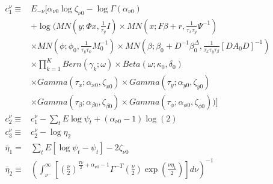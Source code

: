 \documentclass[11pt]{article}
\begin{document}
\begin{align*}
	c_{1}^{\nu}\equiv&E_{-\nu}\Bigg[\alpha_{\nu0}\log\zeta_{\nu0}-\log\Gamma\left(\alpha_{\nu0}\right)\\&+\log\Bigg(MN\left(y;\Phi x,\frac{1}{\tau_{y}}I\right)\times MN\left(x;F\beta+r,\frac{1}{\tau_{x}\tau_{y}}\Psi^{-1}\right)\\&\times MN\left(\phi;\phi_{0},\frac{1}{\tau_{y}\tau_{\phi}}M_{0}^{-1}\right)\times MN\left(\beta;\beta_{0}+D^{-1}\beta_{0}^{\Delta},\frac{1}{\tau_{x}\tau_{y}\tau_{\beta}}\left[DA_{0}D\right]^{-1}\right)\\&\times\prod_{k=1}^{K}Bern\left(\gamma_{k};\omega\right)\times Beta\left(\omega;\kappa_{0},\delta_{0}\right)\\&\times Gamma\left(\tau_{x};\alpha_{x0},\zeta_{x0}\right)\times Gamma\left(\tau_{y};\alpha_{y0},\zeta_{y0}\right)\\&\times Gamma\left(\tau_{\beta};\alpha_{\beta0},\zeta_{\beta0}\right)\times Gamma\left(\tau_{\phi};\alpha_{\phi0},\zeta_{\phi0}\right)\Bigg)\Bigg]\\c_{2}^{\nu}\equiv&c_{1}^{\nu}-\sum_{t}E\log\psi_{t}+\left(\alpha_{\nu0}-1\right)\log\left(2\right)\\c_{3}^{\nu}\equiv&c_{2}^{\nu}-\log\eta_{2}\\\overline{\eta}_{1}=&\sum_{t}E\left[\log\psi_{t}-\psi_{t}\right]-2\zeta_{\nu0}\\\overline{\eta}_{2}\equiv&\left(\int_{\nu^{-}}^{\infty}\left[\left(\frac{\nu}{2}\right)^{\frac{T\nu}{2}+\alpha_{\nu0}-1}\Gamma^{-T}\left(\frac{\nu}{2}\right)\exp\left(\frac{\nu\eta_{1}}{2}\right)\right]d\nu\right)^{-1}
\end{align*}
\end{document}
